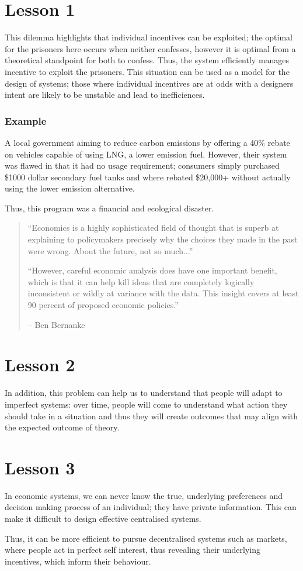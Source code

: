 \documentclass[12pt]{report}
\begin{document}
\section*{Lesson 1}
This dilemma highlights that individual incentives can be exploited; the optimal for the prisoners here occurs when neither confesses,
however it is optimal from a theoretical standpoint for both to confess. Thus, the system efficiently manages
incentive to exploit the prisoners. This situation can be used as a model for the design of systems; those where
individual incentives are at odds with a designers intent are likely to be unstable and lead to inefficiences.

\subsubsection{Example}
A local government aiming to reduce carbon emissions by offering a 40\% rebate on vehicles capable 
of using LNG, a lower emission fuel. However, their system was flawed in that it had no usage requirement;
consumers simply purchased \$1000 dollar secondary fuel tanks and where rebated \$20,000+ without actually
using the lower emission alternative.
\par
Thus, this program was a financial and ecological disaster.

\begin{quotation}
``Economics is a highly sophisticated field of thought that is superb at explaining to policymakers precisely 
why the choices they made in the past were wrong. About the future, not so much...''
\par
``However, careful economic analysis does have one important benefit, which is that it can help kill ideas that are completely
logically inconsistent or wildly at variance with the data. This insight covers at least 90 percent of proposed economic policies.''
\par
-- Ben Bernanke
\end{quotation}

\section*{Lesson 2}
In addition, this problem can help us to understand that people will adapt to imperfect systems:
over time, people will come to understand what action they should take in a situation and thus they
will create outcomes that may align with the expected outcome of theory.

\section*{Lesson 3}
In economic systems, we can never know the true, underlying preferences and decision 
making process of an individual; they have private information. This can make it difficult
to design effective centralised systems.
\par
Thus, it can be more efficient to pursue decentralised systems such as markets,
where people act in perfect self interest, thus revealing their underlying incentives, which 
inform their behaviour.
\end{document}
